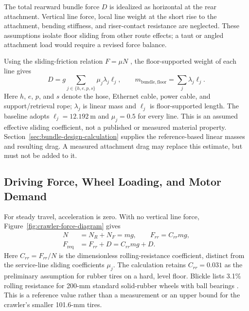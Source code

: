 The total rearward bundle force $D$ is idealized as horizontal at the rear attachment. Vertical line force, local line weight at the short rise to the attachment, bending stiffness, and riser-contact resistance are neglected. These assumptions isolate floor sliding from other route effects; a taut or angled attachment load would require a revised force balance.

Using the sliding-friction relation $F=\mu N$ \citep{openstaxFriction}, the floor-supported weight of each line gives
\begin{equation}
 D=g\sum_{j\in\{h,e,p,s\}}\mu_j\lambda_j\ell_j,
 \qquad m_{\mathrm{bundle,floor}}=\sum_j\lambda_j\ell_j.
 \label{eq:line-drag}
\end{equation}
Here $h$, $e$, $p$, and $s$ denote the hose, Ethernet cable, power cable, and support/retrieval rope; $\lambda_j$ is linear mass and $\ell_j$ is floor-supported length. The baseline adopts $\ell_j=12.192~\mathrm{m}$ and $\mu_j=0.5$ for every line. This is an assumed effective sliding coefficient, not a published or measured material property. Section~\ref{sec:bundle-design-calculation} supplies the reference-based linear masses and resulting drag. A measured attachment drag may replace this estimate, but must not be added to it.
\subsection{Driving Force, Wheel Loading, and Motor Demand}
For steady travel, acceleration is zero. With no vertical line force, Figure~\ref{fig:crawler-force-diagram} gives
\begin{align}
 N&=N_R+N_F=mg, \qquad F_{rr}=C_{rr}mg, \nonumber\\
 F_{\mathrm{req}}&=F_{rr}+D=C_{rr}mg+D.
 \label{eq:crawler-driving-force}
\end{align}
Here $C_{rr}=F_{rr}/N$ is the dimensionless rolling-resistance coefficient, distinct from the service-line sliding coefficients $\mu_j$. The calculation retains $C_{rr}=0.031$ as the preliminary assumption for rubber tires on a hard, level floor. Blickle lists 3.1\% rolling resistance for 200-mm standard solid-rubber wheels with ball bearings \citep{blickleRubberElastomers}. This is a reference value rather than a measurement or an upper bound for the crawler's smaller 101.6-mm tires.


